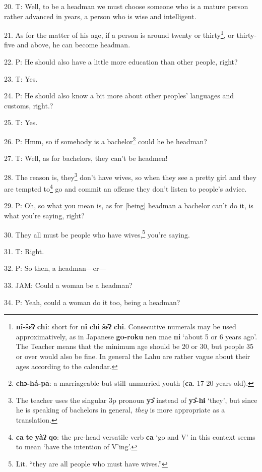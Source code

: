 20. T: Well, to be a headman we must choose someone who is a mature person rather
advanced in years, a person who is wise and intelligent.

21. As for the matter of his age, if a person is around twenty or thirty\footnote{\textbf{nî-šɛ̂ʔ} \textbf{chi}: short for \textbf{nî} \textbf{chi} \textbf{šɛ̂ʔ} \textbf{chi}. Consecutive numerals may be used approximatively, as in Japanese \textbf{go-roku} nen mae \textbf{ni} `about 5 or 6 years ago'. The Teacher means that the minimum age should be 20 or 30, but people 35 or over would also be fine. In general the Lahu are rather vague about their ages according to the calendar.}, or
thirty-five and above, he can become headman.

22. P: He should also have a little more education than other people, right?

23. T: Yes.

24. P: He should also know a bit more about other peoples' languages and customs,
right.?

25. T: Yes.

26. P: Hmm, so if somebody is a bachelor\footnote{\textbf{chɔ-há-pā}: a marriageable but still unmarried youth (\textbf{ca}. 17-20 years old).} could he be headman?

27. T: Well, as for bachelors, they can't be headmen!

28. The reason is, they\footnote{The teacher uses the singular 3p pronoun \textbf{yɔ̂} instead of \textbf{yɔ̂-hɨ} `they', but since he is speaking of bachelors in general, \textit{they} is more appropriate as a translation.} don't have wives, so when they see a pretty girl and
they are tempted to\footnote{\textbf{ca} \textbf{te} \textbf{yàʔ} \textbf{qo}: the pre-head versatile verb \textbf{ca} `go and V' in this context seems to mean `have the intention of V'ing'.} go and commit an offense they don't listen to people's advice.

29. P: Oh, so what you mean is, as for [being] headman a bachelor can't do it,
is what you're saying, right?

30. They all must be people who have wives,\footnote{Lit. ``they are all people who must have wives.''} you're saying.

31. T: Right.

32. P: So then, a headman---er---

33. JAM: Could a woman be a headman?

34. P: Yeah, could a woman do it too, being a headman?

